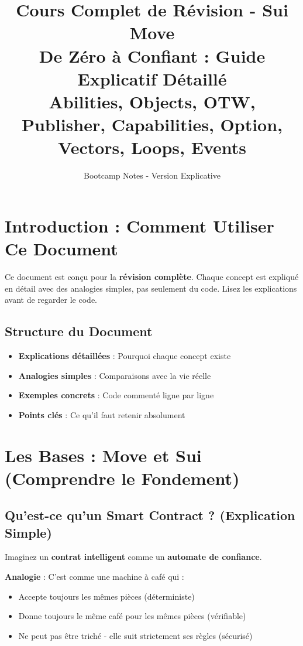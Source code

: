 \documentclass[11pt]{article}
\title{\textbf{Cours Complet de Révision - Sui Move}\\
\large De Zéro à Confiant : Guide Explicatif Détaillé\\
\large Abilities, Objects, OTW, Publisher, Capabilities, Option, Vectors, Loops, Events}
\author{Bootcamp Notes - Version Explicative}
\date{}
\begin{document}
\maketitle
\tableofcontents
\newpage

\section{Introduction : Comment Utiliser Ce Document}

\begin{noteBox}
Ce document est conçu pour la \textbf{révision complète}. Chaque concept est expliqué en détail avec des analogies simples, pas seulement du code. Lisez les explications avant de regarder le code.
\end{noteBox}

\subsection{Structure du Document}
\begin{itemize}
  \item \textbf{Explications détaillées} : Pourquoi chaque concept existe
  \item \textbf{Analogies simples} : Comparaisons avec la vie réelle
  \item \textbf{Exemples concrets} : Code commenté ligne par ligne
  \item \textbf{Points clés} : Ce qu'il faut retenir absolument
\end{itemize}

\section{Les Bases : Move et Sui (Comprendre le Fondement)}

\subsection{Qu'est-ce qu'un Smart Contract ? (Explication Simple)}

Imaginez un \textbf{contrat intelligent} comme un \textbf{automate de confiance}. 

\begin{explainBox}
\textbf{Analogie} : C'est comme une machine à café qui :
\begin{itemize}
  \item Accepte toujours les mêmes pièces (déterministe)
  \item Donne toujours le même café pour les mêmes pièces (vérifiable)
  \item Ne peut pas être triché - elle suit strictement ses règles (sécurisé)
\end{itemize}
\end{explainBox}
\end{document}
